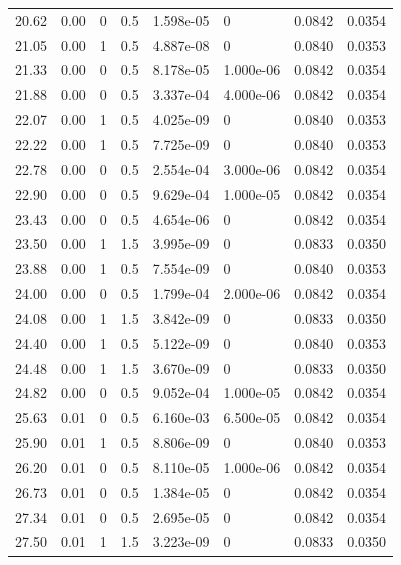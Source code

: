 \documentclass[preview]{standalone}
\begin{document}
{{{\begin{tabular}{L{1.2cm}C{1.2cm} C{0.3cm}C{0.5cm} C{1.4cm}C{1.4cm} C{1.4cm}C{1.4cm}}
  20.62  &  0.00  & 0     & 0.5 &  1.598e-05  & 0  & 0.0842 &  0.0354   \\ 
  21.05  &  0.00  & 1     & 0.5 &  4.887e-08  & 0  & 0.0840 &  0.0353   \\ 
  21.33  &  0.00  & 0     & 0.5 &  8.178e-05  & 1.000e-06  & 0.0842 &  0.0354   \\ 
  21.88  &  0.00  & 0     & 0.5 &  3.337e-04  & 4.000e-06  & 0.0842 &  0.0354   \\ 
  22.07  &  0.00  & 1     & 0.5 &  4.025e-09  & 0  & 0.0840 &  0.0353   \\ 
  22.22  &  0.00  & 1     & 0.5 &  7.725e-09  & 0  & 0.0840 &  0.0353   \\ 
  22.78  &  0.00  & 0     & 0.5 &  2.554e-04  & 3.000e-06  & 0.0842 &  0.0354   \\ 
  22.90  &  0.00  & 0     & 0.5 &  9.629e-04  & 1.000e-05  & 0.0842 &  0.0354   \\ 
  23.43  &  0.00  & 0     & 0.5 &  4.654e-06  & 0  & 0.0842 &  0.0354   \\ 
  23.50  &  0.00  & 1     & 1.5 &  3.995e-09  & 0  & 0.0833 &  0.0350   \\ 
  23.88  &  0.00  & 1     & 0.5 &  7.554e-09  & 0  & 0.0840 &  0.0353   \\ 
  24.00  &  0.00  & 0     & 0.5 &  1.799e-04  & 2.000e-06  & 0.0842 &  0.0354   \\ 
  24.08  &  0.00  & 1     & 1.5 &  3.842e-09  & 0  & 0.0833 &  0.0350   \\ 
  24.40  &  0.00  & 1     & 0.5 &  5.122e-09  & 0  & 0.0840 &  0.0353   \\ 
  24.48  &  0.00  & 1     & 1.5 &  3.670e-09  & 0  & 0.0833 &  0.0350   \\ 
  24.82  &  0.00  & 0     & 0.5 &  9.052e-04  & 1.000e-05  & 0.0842 &  0.0354   \\ 
  25.63  &  0.01  & 0     & 0.5 &  6.160e-03  & 6.500e-05  & 0.0842 &  0.0354   \\ 
  25.90  &  0.01  & 1     & 0.5 &  8.806e-09  & 0  & 0.0840 &  0.0353   \\ 
  26.20  &  0.01  & 0     & 0.5 &  8.110e-05  & 1.000e-06  & 0.0842 &  0.0354   \\ 
  26.73  &  0.01  & 0     & 0.5 &  1.384e-05  & 0  & 0.0842 &  0.0354   \\ 
  27.34  &  0.01  & 0     & 0.5 &  2.695e-05  & 0  & 0.0842 &  0.0354   \\ 
  27.50  &  0.01  & 1     & 1.5 &  3.223e-09  & 0  & 0.0833 &  0.0350   \\ 

\end{tabular}}}}
\end{document}
